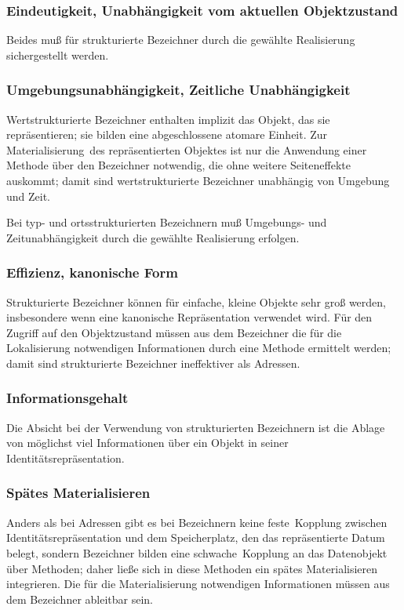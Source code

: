 \subsubsection{Eindeutigkeit, Unabh\"{a}ngigkeit vom aktuellen
Objektzustand}
%
Beides mu\ss{} f\"{u}r strukturierte Bezeichner durch die ge\-w\"{a}hl\-te
Realisierung sichergestellt werden.
%
\subsubsection{Umgebungsunabh\"{a}ngigkeit, Zeitliche Unabh\"{a}ngigkeit}
%
Wertstrukturierte Bezeichner enthalten implizit das Objekt, das sie
repr\"{a}sentieren; sie bilden eine abgeschlossene atomare Einheit. Zur
\rglq{}Materialisierung\rgrq\ des repr\"{a}sentierten Objektes ist nur die
Anwendung einer Methode \"{u}ber den Bezeichner notwendig, die ohne
weitere Seiteneffekte auskommt; damit sind wertstrukturierte
Bezeichner unabh\"{a}ngig von Umgebung und Zeit.
%
\par{}Bei typ- und ortsstrukturierten Bezeichnern mu\ss{} Umgebungs- und
Zeitunabh\"{a}ngigkeit durch die gew\"{a}hlte Realisierung erfolgen.
%
\subsubsection{Effizienz, kanonische Form}
%
Strukturierte Bezeichner k\"{o}nnen f\"{u}r einfache, kleine Objekte sehr
gro\ss{} werden, insbesondere wenn eine kanonische Repr\"{a}sentation
verwendet wird.  F\"{u}r den Zugriff auf den Objektzustand m\"{u}ssen aus
dem Bezeichner die f\"{u}r die Lokalisierung notwendigen Informationen
durch eine Methode ermittelt werden; damit sind strukturierte
Bezeichner ineffektiver als Adressen.
%
\subsubsection{Informationsgehalt}
%
Die Absicht bei der Verwendung von strukturierten Bezeichnern ist die
Ablage von m\"{o}glichst viel Informationen \"{u}ber ein Objekt in seiner
Identit\"{a}tsrepr\"{a}sentation.
%
\subsubsection{Sp\"{a}tes Materialisieren}
%
Anders als bei Adressen gibt es bei Bezeichnern keine
\rglq{}feste\rgrq\ Kopplung zwischen
Iden\-ti\-t\"{a}ts\-re\-pr\"{a}\-sen\-ta\-tion und dem Speicherplatz, den
das repr\"{a}sentierte Datum belegt, sondern Bezeichner bilden eine
\rglq{}schwache\rgrq\ Kopplung an das Datenobjekt \"{u}ber Methoden; daher
lie\ss{}e sich in diese Methoden ein sp\"{a}tes Materialisieren integrieren.
Die f\"{u}r die Materialisierung notwendigen Informationen m\"{u}ssen aus
dem Bezeichner ableitbar sein.
%
